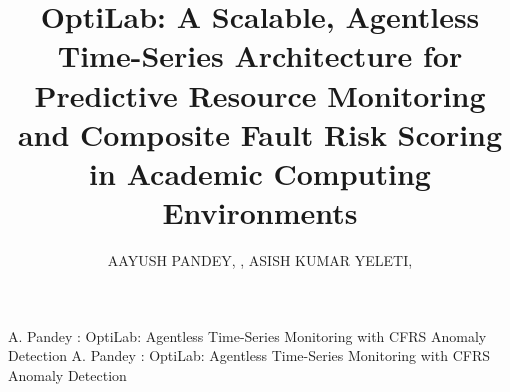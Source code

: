 \documentclass{ieeeaccess}
\begin{document}
\pagestyle{fancy}
\thispagestyle{fancy}

\title{OptiLab: A Scalable, Agentless Time-Series Architecture for Predictive Resource Monitoring and Composite Fault Risk Scoring in Academic Computing Environments}

\author{
\uppercase{Aayush Pandey}, ,
\uppercase{Asish Kumar Yeleti}, 
}

\address[1]{Department of Information Science and Engineering, RV College of Engineering, Bengaluru 560059, India}

\markboth
{A. Pandey \headeretal: OptiLab: Agentless Time-Series Monitoring with CFRS Anomaly Detection}
{A. Pandey \headeretal: OptiLab: Agentless Time-Series Monitoring with CFRS Anomaly Detection}

\doi{}
\end{document}
